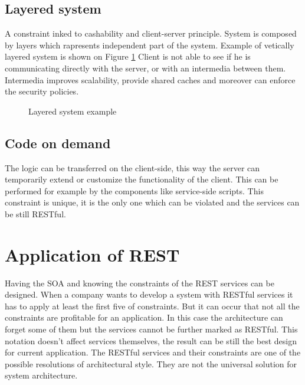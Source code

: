 \subsection{Layered system}

A constraint inked to cashability and client-server principle. System is composed by layers which rapresents independent part of the system. Example of vetically layered system is shown on Figure \ref{fig:layered-system} Client is not able to see if he is communicating directly with the server, or with an intermedia between them. Intermedia improves scalability, provide shared caches and moreover can enforce the security policies.

\begin{figure}[htp] 
\caption{Layered system example}
\label{fig:layered-system}
\end{figure} 

\subsection{Code on demand}

The logic can be transferred on the client-side, this way the server can temporarily extend or customize the functionality of the client. This can be performed for example by the components like service-side scripts.
This constraint is unique, it is the only one which can be violated and the services can be still RESTful.

\section{Application of REST}

Having the SOA and knowing the constraints of the REST services can be designed. When a company wants to develop a system with RESTful services it has to apply at least the first five of constraints. But it can occur that not all the constraints are profitable for an application. In this case the architecture can forget some of them but the services cannot be further marked as RESTful. This notation doesn't affect services themselves, the result can be still the best design for current application. The RESTful services and their constraints are one of the possible resolutions of architectural style. They are not the universal solution for system architecture.

